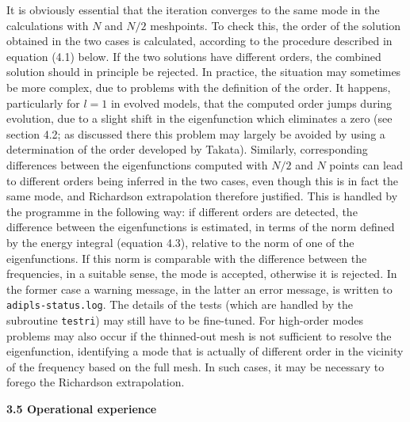It is obviously essential that the iteration converges to the
same mode in the calculations with $N$ and $N/2$ meshpoints.
To check this, the order of the solution obtained in the two cases
is calculated, according to the procedure described in 
equation (4.1) below.
If the two solutions have different orders, the combined solution
should in principle be rejected.
In practice, the situation may sometimes be more complex,
due to problems with the definition of the order.
It happens, particularly for $l = 1$ in evolved models,
that the computed order jumps during evolution, due to
a slight shift in the eigenfunction which eliminates a zero
(see section 4.2; as discussed there this problem may largely be 
avoided by using a determination of the order developed by Takata).
Similarly, corresponding differences between the eigenfunctions
computed with $N/2$ and $N$ points can lead to different orders
being inferred in the two cases, even though this is in fact the same
mode, and Richardson extrapolation therefore justified.
This is handled by the programme in the following way:
if different orders are detected, the difference between the
eigenfunctions is estimated, in terms of the norm defined
by the energy integral (equation 4.3), relative to the norm
of one of the eigenfunctions.
If this norm is comparable with the difference between the frequencies,
in a suitable sense, the mode is accepted, otherwise it is rejected.
In the former case a warning message, in the latter an error message,
is written to {\tt adipls-status.log}.
The details of the tests (which are handled by the subroutine {\tt testri})
may still have to be fine-tuned.
For high-order modes problems may also occur if the thinned-out mesh is
not sufficient to resolve the eigenfunction, identifying a mode that
is actually of different order in the vicinity of the frequency based on
the full mesh.
In such cases, it may be necessary to forego the Richardson extrapolation.


\subsect
{\bf 3.5 Operational experience} 

